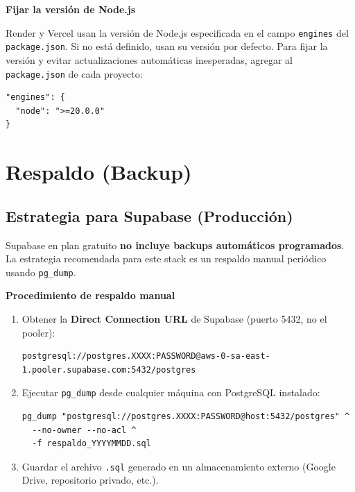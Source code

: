 \documentclass[12pt, a4paper]{article}
\begin{document}
\bigskip
\textbf{Fijar la versión de Node.js}

Render y Vercel usan la versión de Node.js especificada en el campo \texttt{engines} del \texttt{package.json}.
Si no está definido, usan su versión por defecto. Para fijar la versión y evitar actualizaciones
automáticas inesperadas, agregar al \texttt{package.json} de cada proyecto:

\begin{lstlisting}
"engines": {
  "node": ">=20.0.0"
}
\end{lstlisting}

\section{Respaldo (Backup)}

\subsection{Estrategia para Supabase (Producción)}

Supabase en plan gratuito \textbf{no incluye backups automáticos programados}.
La estrategia recomendada para este stack es un respaldo manual periódico usando \texttt{pg\_dump}.

\bigskip
\textbf{Procedimiento de respaldo manual}

\begin{enumerate}
    \item Obtener la \textbf{Direct Connection URL} de Supabase (puerto 5432, no el pooler):

\begin{lstlisting}
postgresql://postgres.XXXX:PASSWORD@aws-0-sa-east-1.pooler.supabase.com:5432/postgres
\end{lstlisting}

    \item Ejecutar \texttt{pg\_dump} desde cualquier máquina con PostgreSQL instalado:

\begin{lstlisting}
pg_dump "postgresql://postgres.XXXX:PASSWORD@host:5432/postgres" ^
  --no-owner --no-acl ^
  -f respaldo_YYYYMMDD.sql
\end{lstlisting}

    \item Guardar el archivo \texttt{.sql} generado en un almacenamiento externo
          (Google Drive, repositorio privado, etc.).
\end{enumerate}
\end{document}
